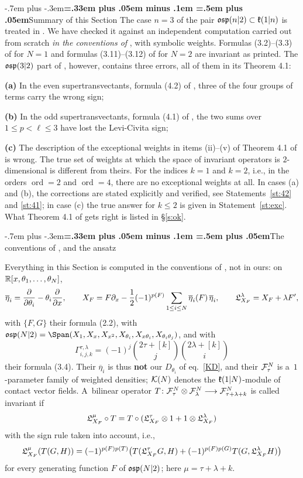 \documentclass[12pt,a4paper]{amsart}
\makeatletter
\providecommand{\headspaces}{\spaceskip=.33em plus .05em minus .1em \xspaceskip=.5em plus .05em}
\def\subsection{\@startsection{subsection}{2}{0pt}{-1ex \@plus -.4ex \@minus -.2ex}%
  {-.7em plus -.3em}{\normalfont\normalsize\bfseries\boldmath\headspaces}}
\theoremstyle{thm}
\theoremstyle{definition}
\let\ssec\subsection
\newcommand {\tp}{\otimes}
\newcommand {\Nord}{\operatorname{ord}}   %
\newcommand {\etb}{\overline{\eta}}
\makeatother
\begin{document}
\ssec{Summary of this Section}\label{blosummary}
The case $n=3$ of the pair ${\mathfrak{osp}}(n|2)\subset{\mathfrak{k}}(1|n)$ is treated in \cite{BLO}. We have
checked it against an independent computation carried out from scratch \textit{in the
conventions of} \cite{BLO}, with symbolic weights. Formulas
(3.2)--(3.3) of \cite{BLO} for $N=1$ and formulas (3.11)--(3.12) of \cite{BLO} for $N=2$ are invariant as printed.
The ${\mathfrak{osp}}(3|2)$ part of \cite{BLO}, however, contains three errors, all of them in its
Theorem 4.1:

\textbf{(a)} In the even supertransvectants, formula (4.2) of \cite{BLO}, three of the four groups of
terms carry the wrong sign;

\textbf{(b)} In the odd supertransvectants, formula (4.1) of \cite{BLO}, the two sums
over $1\leq p<\ell\leq 3$ have lost the Levi-Civita sign;

\textbf{(c)} The description of the exceptional weights
in items (ii)--(v) of Theorem 4.1 of \cite{BLO} is wrong. The true set of weights at which the space
of invariant operators is $2$-dimensional is different from theirs. For the indices $k=1$
and $k=2$, i.e., in the orders $\Nord=2$ and $\Nord=4$, there are no exceptional weights at all. In cases (a) and (b), the corrections are stated
explicitly and verified, see Statements~\ref{st:42} and \ref{st:41}; in case (c) the true
answer for $k\leq2$ is given in Statement~\ref{st:exc}. What Theorem 4.1 of \cite{BLO} gets
right is listed in \S\ref{s:ok}.

\ssec{The conventions of \cite{BLO}, and the ansatz}\label{s:setup}

\label{s:conv3}
Everything in this Section is computed in the conventions of \cite{BLO}, not in ours: on
${\mathbb R}[x,\theta_1,\dots,\theta_N]$,
\begin{equation}\label{eq:conv}
\etb_i=\frac{\partial}{\partial \theta_i}-\theta_i\frac{\partial}{\partial x},
\qquad
X_F=F\partial_x-\frac12(-1)^{p(F)}\sum_{1\leq i\leq N}\etb_i(F)\,\etb_i,
\qquad
\fL^{\lambda}_{X_F}=X_F+\lambda F',
\end{equation}
with $\{F,G\}$ their formula (2.2), with
$\fosp(N|2)=\Span(X_1,X_x,X_{x^2},X_{\theta_i},X_{x\theta_i},X_{\theta_i\theta_j})$, and with
\begin{equation}\label{eq:Gamma}
\Gamma^{\tau,\lambda}_{i,j,k}=(-1)^j\binom{2\tau+[k]}{j}\binom{2\lambda+[k]}{i}
\end{equation}
their formula (3.4). Their $\etb_i$ is thus \textbf{not} our $D_{\theta_i}$ of eq.~\eqref{KD}, and
their ${\mathcal F}^N_\tau$ is a~$1$-parameter family of weighted densities; ${\mathcal K}(N)$ denotes the ${\mathfrak{k}}(1|N)$-module of contact vector fields. A~bilinear operator
$T\colon\cF^N_\tau\tp\cF^N_\lambda\longrightarrow\cF^N_{\tau+\lambda+k}$ is called invariant if
\[
\fL^{\mu}_{X_F}\circ T=T\circ(\fL^{\tau}_{X_F}\tp1+1\tp\fL^{\lambda}_{X_F})
\]
with the sign rule taken into account, i.e.,
\[
{\mathfrak{L}}^{\mu}_{X_F}(T(G,H))=(-1)^{p(F)p(T)}\big(T({\mathfrak{L}}^{\tau}_{X_F}G,H)+(-1)^{p(F)p(G)}T(G,{\mathfrak{L}}^{\lambda}_{X_F}H)\big)
\]
for every generating function $F$ of ${\mathfrak{osp}}(N|2)$; here
$\mu=\tau+\lambda+k$.
\end{document}
